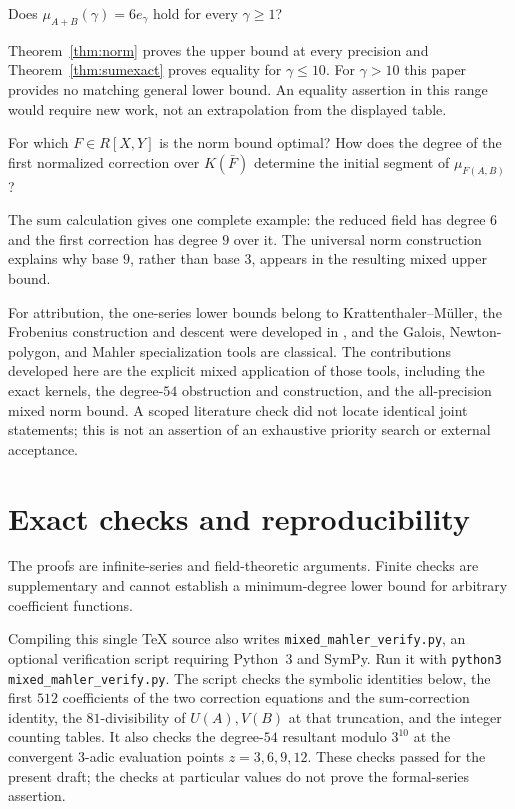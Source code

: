 \begin{question}
Does $\mu_{A+B}(\gamma)=6e_\gamma$ hold for every $\gamma\ge1$?
\end{question}
Theorem~\ref{thm:norm} proves the upper bound at every precision and
Theorem~\ref{thm:sumexact} proves equality for $\gamma\le10$.
For $\gamma>10$ this paper provides no matching general lower bound.
An equality assertion in this range would require new work, not an
extrapolation from the displayed table.

\begin{question}
For which $F\in R[X,Y]$ is the norm bound optimal? How does the
degree of the first normalized correction over $K(\bar F)$ determine
the initial segment of $\mu_{F(A,B)}$?
\end{question}
The sum calculation gives one complete example: the reduced field
has degree $6$ and the first correction has degree $9$ over it.
The universal norm construction explains why base $9$, rather than
base $3$, appears in the resulting mixed upper bound.

For attribution, the one-series lower bounds belong to
Krattenthaler--M\"uller, the Frobenius construction and descent were
developed in \cite{KEIO70}, and the Galois, Newton-polygon, and Mahler
specialization tools are classical. The contributions developed here
are the explicit mixed application of those tools, including the
exact kernels, the degree-$54$ obstruction and construction, and the
all-precision mixed norm bound. A scoped literature check did not
locate identical joint statements; this is not an assertion of an
exhaustive priority search or external acceptance.

\appendix
\section{Exact checks and reproducibility}
\label{app:checks}

The proofs are infinite-series and field-theoretic arguments. Finite
checks are supplementary and cannot establish a minimum-degree lower
bound for arbitrary coefficient functions.

Compiling this single TeX source also writes
\texttt{mixed\_mahler\_verify.py}, an optional verification script requiring
Python~3 and SymPy. Run it with
\texttt{python3 mixed\_mahler\_verify.py}.
The script checks the symbolic identities below, the first $512$
coefficients of the two correction equations and the sum-correction
identity, the $81$-divisibility of $U(A),V(B)$ at that truncation,
and the integer counting tables. It also checks the degree-$54$
resultant modulo $3^{10}$ at the convergent $3$-adic evaluation points
$z=3,6,9,12$. These checks passed for the present draft; the checks
at particular values do not prove the formal-series assertion.

